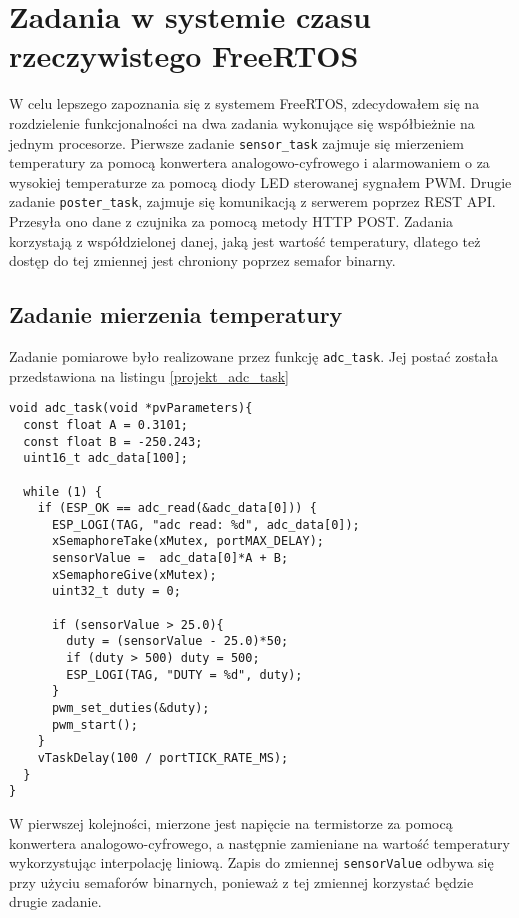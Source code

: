 \section{Zadania w systemie czasu rzeczywistego FreeRTOS}
\label{projekt_taski}

W celu lepszego zapoznania się z systemem FreeRTOS, zdecydowałem się na rozdzielenie 
funkcjonalności na dwa zadania wykonujące się współbieżnie na jednym procesorze. 
Pierwsze zadanie \verb+sensor_task+ zajmuje się mierzeniem temperatury 
za pomocą konwertera analogowo-cyfrowego i alarmowaniem o za wysokiej temperaturze
za pomocą diody LED sterowanej sygnałem PWM. 
Drugie zadanie \verb+poster_task+,
zajmuje się komunikacją z serwerem poprzez REST API. Przesyła ono dane z czujnika
za pomocą metody HTTP POST. Zadania korzystają z współdzielonej danej, jaką jest 
wartość temperatury, dlatego też dostęp do tej zmiennej jest chroniony poprzez 
semafor binarny.

\subsection{Zadanie mierzenia temperatury}
\label{projekt_sensor_task}
Zadanie pomiarowe było realizowane przez funkcję \verb+adc_task+. Jej postać została przedstawiona 
na listingu \ref{projekt_adc_task}

\begin{lstlisting}[style=customc,
  frame=single,
  caption={Postać funkcji mierzącej temperaturę},
  captionpos=b,
  label={projekt_adc_task}]
void adc_task(void *pvParameters){
  const float A = 0.3101;
  const float B = -250.243;
  uint16_t adc_data[100];

  while (1) {
    if (ESP_OK == adc_read(&adc_data[0])) {
      ESP_LOGI(TAG, "adc read: %d", adc_data[0]);
      xSemaphoreTake(xMutex, portMAX_DELAY);
      sensorValue =  adc_data[0]*A + B;
      xSemaphoreGive(xMutex);
      uint32_t duty = 0;        
            
      if (sensorValue > 25.0){
        duty = (sensorValue - 25.0)*50;
        if (duty > 500) duty = 500;
        ESP_LOGI(TAG, "DUTY = %d", duty);
      }
      pwm_set_duties(&duty);
      pwm_start();
    }
    vTaskDelay(100 / portTICK_RATE_MS);
  }
}
\end{lstlisting}

W pierwszej kolejności, mierzone jest napięcie na termistorze za pomocą konwertera 
analogowo-cyfrowego, a następnie zamieniane na wartość temperatury wykorzystując
interpolację liniową. Zapis do zmiennej \verb+sensorValue+ odbywa się przy użyciu
semaforów binarnych, ponieważ z tej zmiennej korzystać będzie drugie zadanie. \\

